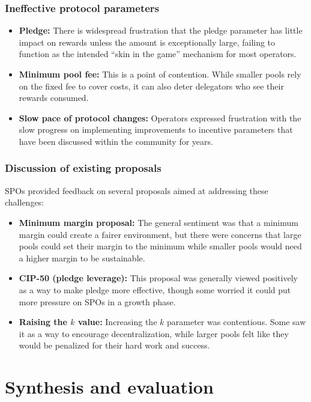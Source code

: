 \documentclass[11pt, letterpaper]{article}
\begin{document}
\subsubsection{Ineffective protocol parameters}
\begin{itemize}
	\item \textbf{Pledge:} There is widespread frustration that the pledge parameter has little impact on
	      rewards unless the amount is exceptionally large, failing to function as the intended ``skin in the game''
	      mechanism for most operators.
	\item \textbf{Minimum pool fee:} This is a point of contention. While smaller pools rely on the fixed fee
	      to cover costs, it can also deter delegators who see their rewards consumed.
	\item \textbf{Slow pace of protocol changes:} Operators expressed frustration with the slow progress on
	      implementing improvements to incentive parameters that have been discussed within the community for years.
\end{itemize}

\subsubsection{Discussion of existing proposals}
SPOs provided feedback on several proposals aimed at addressing these
challenges:
\begin{itemize}
	\item \textbf{Minimum margin proposal:} The general sentiment was that a minimum margin could create a
	      fairer environment, but there were concerns that large pools could set their margin to the minimum while
	      smaller pools would need a higher margin to be sustainable.
	\item \textbf{CIP-50 (pledge leverage):} This proposal was generally viewed positively as a way to make
	      pledge more effective, though some worried it could put more pressure on SPOs in a growth phase.
	\item \textbf{Raising the $k$ value:} Increasing the $k$ parameter was contentious. Some saw it as a way to
	      encourage decentralization, while larger pools felt like they would be penalized for their hard work and
	      success.
\end{itemize}

\section{Synthesis and evaluation}
\label{sec:synthesis}
\end{document}
